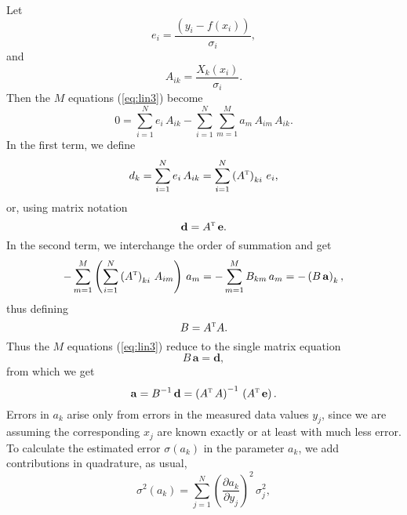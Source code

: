 \documentclass[12pt]{article}
\begin{document}
\noindent Let
\begin{equation}   \label{eq:lin5}
  e_i = \frac{\left(y_i - f(x_i)\right)}{\sigma_i},
\end{equation}
  and
\begin{equation}    \label{eq:lin6}
 A_{i k} = \frac{X_k(x_i)}{\sigma_i}.
\end{equation}  
Then the $M$ equations (\ref{eq:lin3}) become
\begin{equation}    \label{eq:lin7}
 0 = \sum_{i=1}^N  e_i\,A_{i k}  - \sum_{i=1}^N \sum_{m=1}^M a_m\,A_{i m}\,A_{i k}.
\end{equation}
In the first term, we define
\begin{equation}   \label{eq:lin8}
 d_k = \sum_{i=1}^N e_i\,A_{i k} = \sum_{i=1}^N \left( A^{\textsc{t}} \right)_{k i}\,e_i,
\end{equation}
  or, using matrix notation
\begin{equation}    \label{eq:lin9}
  \mathbf{d} = A^{\textsc{t}}\,\mathbf{e}.
\end{equation}  
In the second term, we interchange the order of summation and get
\begin{equation}
 -\sum_{m=1}^M \left( \sum_{i=1}^N \left(A^{\textsc{t}} \right)_{k i}\,A_{i m} \right)\,a_m = -\sum_{m=1}^M B_{k m}\,a_m 
   = -\left( B\,\mathbf{a} \right)_k,
\end{equation}
  thus defining
\begin{equation}    \label{eq:lin10}
 B = A^{\textsc{t}} A.
\end{equation}  
Thus the $M$ equations (\ref{eq:lin3}) reduce to the single matrix equation
\begin{equation}   \label{eq:lin11}
 B \,\mathbf{a} = \mathbf{d}, 
\end{equation}
  from which we get
\begin{equation}    \label{eq:lin12}
  \mathbf{a} = B^{-1}\,\mathbf{d} = \left( A^{\textsc{t}}\,A \right)^{-1}\,\left( A^{\textsc{t}}\,\mathbf{e} \right).
\end{equation}  
Errors in $a_k$  arise only from errors in the
   measured data values $y_j$, since we are assuming the corresponding $x_j$ are known exactly
   or at least with much less error.
To calculate the estimated error $\sigma(a_k)$ in the parameter $a_k$, we 
   add contributions in quadrature, as usual,
\begin{equation}    \label{eq:lin13}
  \sigma^2 (a_k) = \sum_{j=1}^N \left(\frac{\partial a_k}{\partial y_j} \right)^2\,\sigma_j^2,
\end{equation} 
\end{document}
